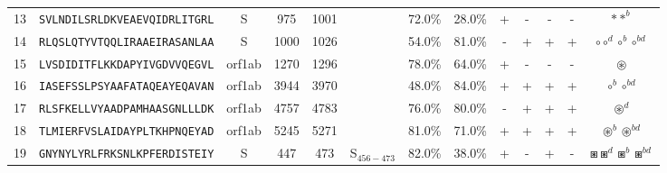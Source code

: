 \begin{tabular}{rcccccccccccc}
13 &  \texttt{SVLNDILSRLDKVEAEVQIDRLITGRL} &       S &    975 &  1001 &                &                          72.0\% &                           28.0\% &          + &           - &          - &           - &                                                                                                                          $ \ast \ast^b $ \\
14 &  \texttt{RLQSLQTYVTQQLIRAAEIRASANLAA} &       S &   1000 &  1026 &                &                          54.0\% &                           81.0\% &          - &           + &          + &           + &                                                                                                     $ \circ \circ^d \circ^b \circ^{bd} $ \\
15 &  \texttt{LVSDIDITFLKKDAPYIVGDVVQEGVL} &  orf1ab &   1270 &  1296 &                &                          78.0\% &                           64.0\% &          + &           - &          - &           - &                                                                                                                          $ \circledast $ \\
16 &  \texttt{IASEFSSLPSYAAFATAQEAYEQAVAN} &  orf1ab &   3944 &  3970 &                &                          48.0\% &                           84.0\% &          + &           + &          + &           + &                                                                                                                   $ \circ^b \circ^{bd} $ \\
17 &  \texttt{RLSFKELLVYAADPAMHAASGNLLLDK} &  orf1ab &   4757 &  4783 &                &                          76.0\% &                           80.0\% &          - &           + &          + &           + &                                                                                                                        $ \circledast^d $ \\
18 &  \texttt{TLMIERFVSLAIDAYPLTKHPNQEYAD} &  orf1ab &   5245 &  5271 &                &                          81.0\% &                           71.0\% &          + &           + &          + &           + &                                                                                                       $ \circledast^b \circledast^{bd} $ \\
19 &  \texttt{GNYNYLYRLFRKSNLKPFERDISTEIY} &       S &    447 &   473 &  S$_{456-473}$ &                          82.0\% &                           38.0\% &          + &           - &          + &           - &                                                                                             $ \boxast \boxast^d \boxast^b \boxast^{bd} $ \\

\end{tabular}
